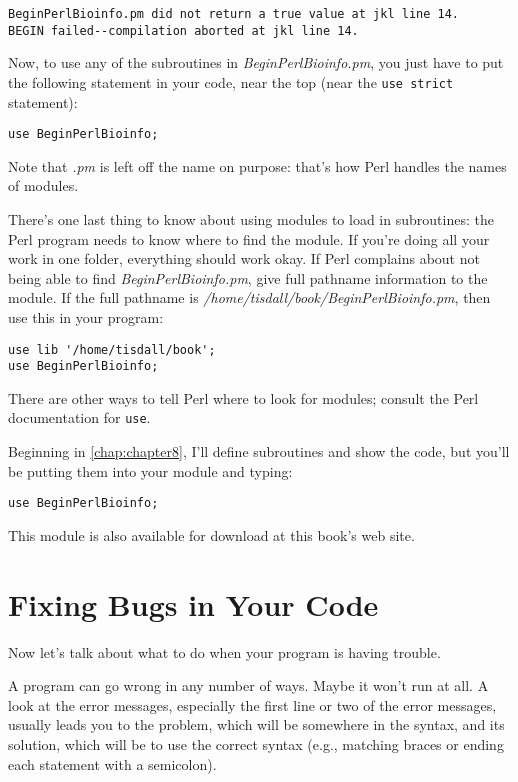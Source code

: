\begin{lstlisting}
BeginPerlBioinfo.pm did not return a true value at jkl line 14.
BEGIN failed--compilation aborted at jkl line 14.
\end{lstlisting}

Now, to use any of the subroutines in \textit{BeginPerlBioinfo.pm}, you just have to put the following statement in your code, near the top (near the \verb|use strict| statement): 

\begin{lstlisting}
use BeginPerlBioinfo;
\end{lstlisting}

Note that \textit{.pm} is left off the name on purpose: that's how Perl handles the names of modules.

There's one last thing to know about using modules to load in subroutines: the Perl program needs to know where to find the module. If you're doing all your work in one folder, everything should work okay.  If Perl complains about not being able to find \textit{BeginPerlBioinfo.pm}, give full pathname information to the module. If the full pathname is \textit{/home/tisdall/book/BeginPerlBioinfo.pm}, then use this in your program:

\begin{lstlisting}
use lib '/home/tisdall/book';
use BeginPerlBioinfo;
\end{lstlisting}

There are other ways to tell Perl where to look for modules; consult the Perl documentation for \verb|use|.

Beginning in \autoref{chap:chapter8}, I'll define subroutines and show the code, but you'll be putting them into your module and typing:

\begin{lstlisting}
use BeginPerlBioinfo;
\end{lstlisting}

This module is also available for download at this book's web site. 

\section{Fixing Bugs in Your Code}
Now let's talk about what to do when your program is having trouble.

A program can go wrong in any number of ways. Maybe it won't run at all. A look at the error messages, especially the first line or two of the error messages, usually leads you to the problem, which will be somewhere in the syntax, and its solution, which will be to use the correct syntax (e.g., matching braces or ending each statement with a semicolon).

